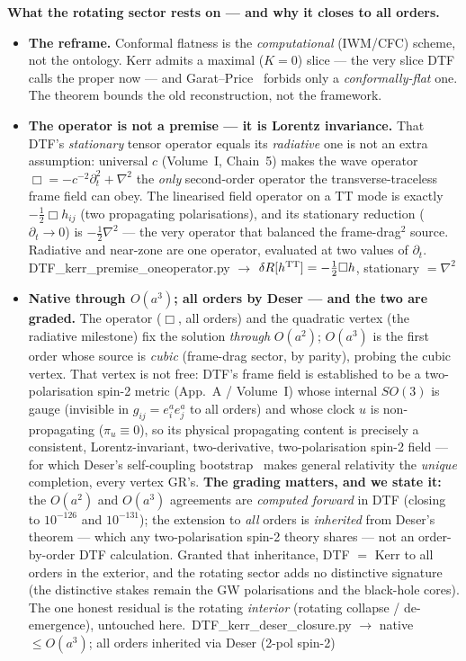 \documentclass[11pt]{article}
\newcommand{\pychip}[2]{{\footnotesize\colorbox{cbPyBg}{\ttfamily\,#1\,}\,{\color{gray}$\to$ #2}}}
\begin{document}
\textbf{What the rotating sector rests on --- and why it closes to all orders.}
\begin{itemize}[leftmargin=1.5em,itemsep=3pt,topsep=3pt]
  \item \textbf{The reframe.} Conformal flatness is the \emph{computational} (IWM/CFC) scheme, not the
    ontology. Kerr admits a maximal ($K=0$) slice --- the very slice DTF calls the proper now ---
    and Garat--Price~\cite{GaratPrice2000} forbids only a \emph{conformally-flat} one. The theorem bounds
    the old reconstruction, not the framework.
  \item \textbf{The operator is not a premise --- it is Lorentz invariance.} That DTF's \emph{stationary}
    tensor operator equals its \emph{radiative} one is not an extra assumption: universal $c$ (Volume~I,
    Chain~5) makes the wave operator $\Box=-c^{-2}\partial_t^2+\nabla^2$ the \emph{only} second-order
    operator the transverse-traceless frame field can obey. The linearised field operator on a TT mode is
    exactly $-\tfrac12\Box h_{ij}$ (two propagating polarisations), and its stationary reduction
    ($\partial_t\!\to\!0$) is $-\tfrac12\nabla^2$ --- the very operator that balanced the frame-drag$^2$
    source. Radiative and near-zone are one operator, evaluated at two values of $\partial_t$.
    \pychip{DTF\_kerr\_premise\_oneoperator.py}{$\delta R[h^{\rm TT}]=-\tfrac12\Box h$, stationary $=\nabla^2$}
  \item \textbf{Native through $O(a^3)$; all orders by Deser --- and the two are graded.} The operator
    ($\Box$, all orders) and the quadratic vertex (the radiative milestone) fix the solution \emph{through}
    $O(a^2)$; $O(a^3)$ is the first order whose source is \emph{cubic} (frame-drag sector, by parity), probing
    the cubic vertex. That vertex is not free: DTF's frame field is established to be a two-polarisation
    spin-2 metric (App.~A / Volume~I) whose internal $SO(3)$ is gauge (invisible in $g_{ij}=e^a_ie^a_j$ to all
    orders) and whose clock $u$ is non-propagating ($\pi_u\equiv0$), so its physical propagating content is
    precisely a consistent, Lorentz-invariant, two-derivative, two-polarisation spin-2 field --- for which
    Deser's self-coupling bootstrap~\cite{Deser1970} makes general relativity the \emph{unique} completion,
    every vertex GR's. \textbf{The grading matters, and we state it:} the $O(a^2)$ and $O(a^3)$ agreements are
    \emph{computed forward} in DTF (closing to $10^{-126}$ and $10^{-131}$); the extension to \emph{all}
    orders is \emph{inherited} from Deser's theorem --- which any two-polarisation spin-2 theory shares ---
    not an order-by-order DTF calculation. Granted that inheritance, DTF $=$ Kerr to all orders in the
    exterior, and the rotating sector adds no distinctive signature (the distinctive stakes remain the GW
    polarisations and the black-hole cores). The one honest residual is the rotating \emph{interior}
    (rotating collapse / de-emergence), untouched here.
    \pychip{DTF\_kerr\_deser\_closure.py}{native $\le O(a^3)$; all orders inherited via Deser (2-pol spin-2)}
\end{itemize}
\end{document}
